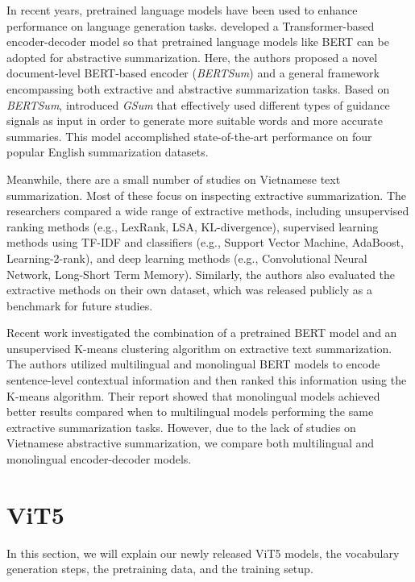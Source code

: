 \documentclass[11pt,a4paper]{article}
\begin{document}
In recent years, pretrained language models have been used to enhance performance on language generation tasks. \cite{Liu2019TextSW} developed a Transformer-based encoder-decoder model so that pretrained language models like BERT can be adopted for abstractive summarization. Here, the authors proposed a novel document-level BERT-based encoder (\textit{BERTSum}) and a general framework encompassing both extractive and abstractive summarization tasks. Based on \textit{BERTSum}, \citet{dou2021gsum} introduced \textit{GSum} that effectively used different types of guidance signals as input in order to generate more suitable words and more accurate summaries. This model accomplished state-of-the-art performance on four popular English summarization datasets.


Meanwhile, there are a small number of studies on Vietnamese text summarization. Most of these focus on inspecting extractive summarization. The researchers \cite{8573420} compared a wide range of extractive methods, including unsupervised ranking methods (e.g., LexRank, LSA, KL-divergence), supervised learning methods using TF-IDF and classifiers (e.g., Support Vector Machine, AdaBoost, Learning-2-rank), and deep learning methods (e.g., Convolutional Neural Network, Long-Short Term Memory). Similarly, the authors \cite{vietnews} also evaluated the extractive methods on their own dataset, which was released publicly as a benchmark for future studies.


Recent work \cite{quoc2021monolingual} investigated the combination of a pretrained BERT model and an unsupervised K-means clustering algorithm on extractive text summarization. The authors utilized multilingual and monolingual BERT models to encode sentence-level contextual information and then ranked this information using the K-means algorithm. Their report showed that monolingual models achieved better results compared when to multilingual models performing the same extractive summarization tasks. However, due to the lack of studies on Vietnamese abstractive summarization, we compare both multilingual and monolingual encoder-decoder models.  


\section{ViT5}

In this section, we will explain our newly released ViT5 models, the vocabulary generation steps, the pretraining data, and the training setup. 
\end{document}
